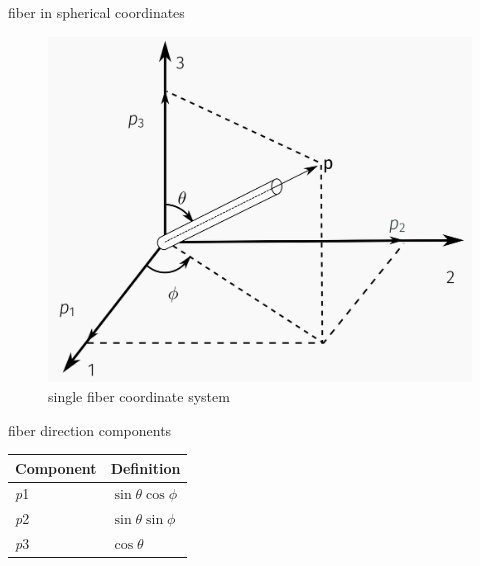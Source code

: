 \documentclass[
  letterpaper,
  ignorenonframetext,
  aspectratio=43,
  handout,
  12pt]{beamer}
\let\Oldincludegraphics\includegraphics
\renewcommand{\includegraphics}[2][]{\Oldincludegraphics[width=\textwidth,height=0.7\textheight,keepaspectratio]{#2}}
\begin{document}
\begin{frame}{fiber in spherical coordinates}
\protect\hypertarget{fiber-in-spherical-coordinates}{}
\begin{figure}
\centering
\includegraphics{../images/single_fiber.png}
\caption{single fiber coordinate system}
\end{figure}
\end{frame}

\begin{frame}{fiber direction components}
\protect\hypertarget{fiber-direction-components}{}
\begin{longtable}[]{@{}ll@{}}
\toprule
Component & Definition \\
\midrule
\endhead
\emph{p}1 & \(\sin \theta \cos \phi\) \\
\emph{p}2 & \(\sin \theta \sin \phi\) \\
\emph{p}3 & \(\cos \theta\) \\
\bottomrule
\end{longtable}
\end{frame}
\end{document}
